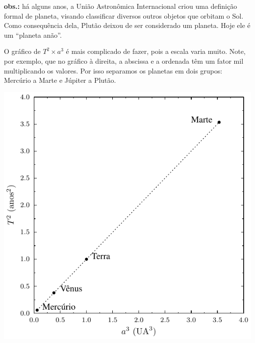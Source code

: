 \documentclass[a4paper]{article}
\begin{document}
\begin{resolucoes}
\begin{exercicio}
\begin{compactenum}[(a)]
  \noindent
  \textbf{obs.:} há alguns anos, a União Astronômica Internacional criou uma definição formal de planeta, visando classificar diversos outros objetos que orbitam o Sol.
  Como consequência dela, Plutão deixou de ser considerado um planeta. Hoje ele é um ``planeta anão''.
  
  \item O gráfico de $T^2\times a^3$ é mais complicado de fazer, pois a escala varia muito.
  Note, por exemplo, que no gráfico à direita, a abscissa e a ordenada têm um fator mil multiplicando os valores.
  Por isso separamos os planetas em dois grupos: Mercúrio a Marte e Júpiter a Plutão.
  
  \noindent
  \begin{minipage}{0.45\textwidth}
    \includegraphics[width=\textwidth]{3a_lei_Kepler_Mercurio-Marte}
  \end{minipage}\hfill
  \begin{minipage}{0.45\textwidth}

\end{minipage}
\end{compactenum}
\end{exercicio}
\end{resolucoes}
\end{document}
